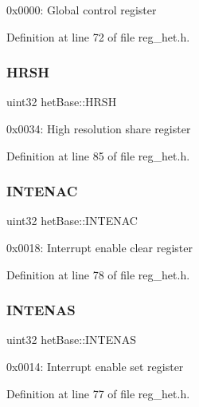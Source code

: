 0x0000\+: Global control register 

Definition at line 72 of file reg\+\_\+het.\+h.

\mbox{\label{structhetBase_a838a22e5b9f2575ccb1360029afdaa43}} 
\subsubsection{\texorpdfstring{H\+R\+SH}{HRSH}}
{\footnotesize\ttfamily uint32 het\+Base\+::\+H\+R\+SH}

0x0034\+: High resolution share register 

Definition at line 85 of file reg\+\_\+het.\+h.

\mbox{\label{structhetBase_a23666554c020885862683adb849a96cf}} 
\subsubsection{\texorpdfstring{I\+N\+T\+E\+N\+AC}{INTENAC}}
{\footnotesize\ttfamily uint32 het\+Base\+::\+I\+N\+T\+E\+N\+AC}

0x0018\+: Interrupt enable clear register 

Definition at line 78 of file reg\+\_\+het.\+h.

\mbox{\label{structhetBase_a961d18a15bf297dcda8acd084db60b23}} 
\subsubsection{\texorpdfstring{I\+N\+T\+E\+N\+AS}{INTENAS}}
{\footnotesize\ttfamily uint32 het\+Base\+::\+I\+N\+T\+E\+N\+AS}

0x0014\+: Interrupt enable set register 

Definition at line 77 of file reg\+\_\+het.\+h.

\mbox{\label{structhetBase_a68ff7d6f751ece1165a9ba2a2f4b65d5}} 

